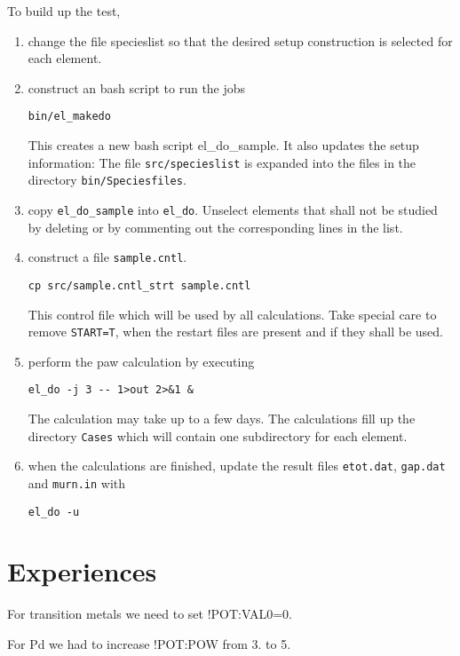 \documentclass{book}
\begin{document}
To build up the test, 
\begin{enumerate}
\item change the file specieslist so that the desired setup
  construction is selected for each element.
%
\item construct an bash script to run the jobs
\begin{verbatim}
bin/el_makedo
\end{verbatim}
This creates a new bash script el\_do\_sample. It also updates the
setup information: The file \verb|src/specieslist| is expanded into
the files in the directory \verb|bin/Speciesfiles|.
%
\item copy \verb|el_do_sample| into \verb|el_do|. Unselect elements
  that shall not be studied by deleting or by commenting out the
  corresponding lines in the list.
%
\item construct a file \verb|sample.cntl|.
\begin{verbatim}
cp src/sample.cntl_strt sample.cntl
\end{verbatim}
This control file which will be used by all calculations. Take special
care to remove \verb|START=T|, when the restart files are present and
if they shall be used.
%
\item perform the paw calculation by executing 
\begin{verbatim}
el_do -j 3 -- 1>out 2>&1 &
\end{verbatim}
The calculation may take up to a few days. The calculations fill up
the directory \verb|Cases| which will contain one subdirectory for
each element.
%
\item when the calculations are finished, update the result files \verb|etot.dat|, \verb|gap.dat| and \verb|murn.in| with
\begin{verbatim}
el_do -u
\end{verbatim}

\end{enumerate}

\section*{Experiences}
For transition metals we need to set !POT:VAL0=0. 

For Pd we had to increase  !POT:POW from 3. to 5.
\end{document}
